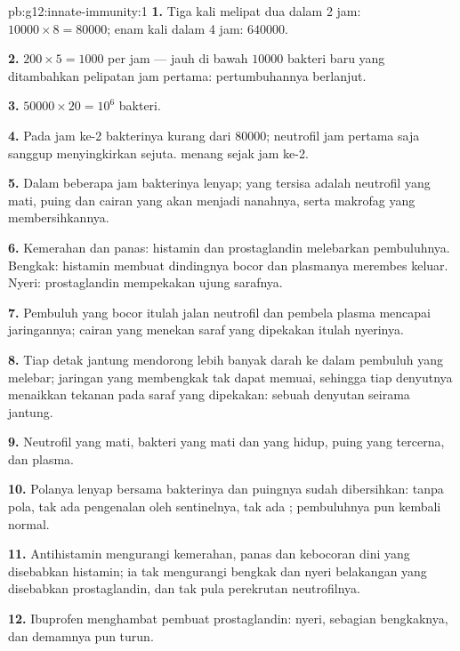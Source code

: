 \begin{solution}{pb:g12:innate-immunity:1}
\textbf{1.} Tiga kali melipat dua dalam 2 jam: $\num{10000} \times 8 =
\num{80000}$; enam kali dalam 4 jam: $\num{640000}$.

\textbf{2.} $200 \times 5 = 1000$ per jam --- jauh di bawah
$\num{10000}$ bakteri baru yang ditambahkan pelipatan jam pertama:
pertumbuhannya berlanjut.

\textbf{3.} $\num{50000} \times 20 = 10^6$ bakteri.

\textbf{4.} Pada jam ke-2 bakterinya kurang dari $\num{80000}$;
neutrofil jam pertama saja sanggup menyingkirkan sejuta. 
menang sejak jam ke-2.

\textbf{5.} Dalam beberapa jam bakterinya lenyap; yang tersisa adalah
neutrofil yang mati, puing dan cairan yang akan menjadi nanahnya,
serta makrofag yang membersihkannya.

\textbf{6.} Kemerahan dan panas: histamin dan prostaglandin melebarkan
pembuluhnya. Bengkak: histamin membuat dindingnya bocor dan plasmanya
merembes keluar. Nyeri: prostaglandin mempekakan ujung sarafnya.

\textbf{7.} Pembuluh yang bocor itulah jalan neutrofil dan 
pembela plasma mencapai jaringannya; cairan yang menekan saraf yang
dipekakan itulah nyerinya.

\textbf{8.} Tiap detak jantung mendorong lebih banyak darah ke dalam
pembuluh yang melebar; jaringan yang membengkak tak dapat memuai,
sehingga tiap denyutnya menaikkan tekanan pada saraf yang dipekakan:
sebuah denyutan seirama jantung.

\textbf{9.} Neutrofil yang mati, bakteri yang mati dan yang hidup,
puing yang tercerna, dan plasma.

\textbf{10.} Polanya lenyap bersama bakterinya dan puingnya sudah
dibersihkan: tanpa pola, tak ada pengenalan oleh sentinelnya, tak ada
; pembuluhnya pun kembali normal.

\textbf{11.} Antihistamin mengurangi kemerahan, panas dan kebocoran
dini yang disebabkan histamin; ia tak mengurangi bengkak dan nyeri
belakangan yang disebabkan prostaglandin, dan tak pula perekrutan
neutrofilnya.

\textbf{12.} Ibuprofen menghambat  pembuat prostaglandin: nyeri,
sebagian bengkaknya, dan demamnya pun turun.


\end{solution}
